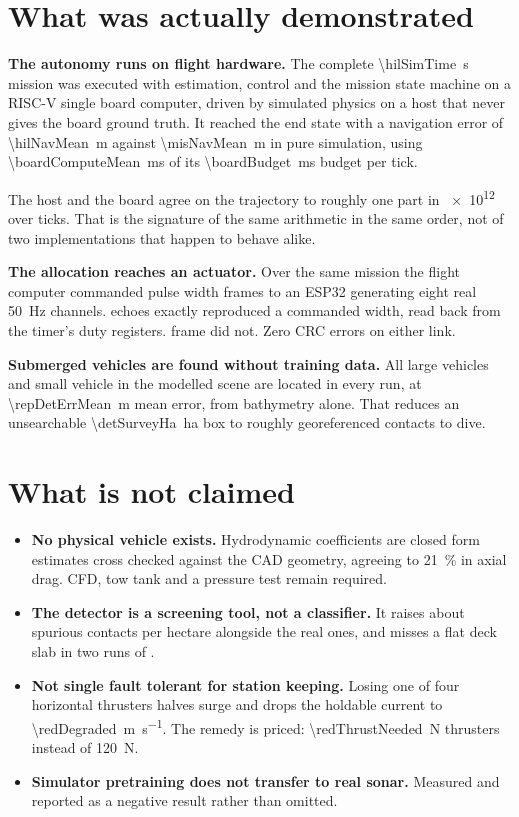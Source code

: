 \documentclass[10pt,a4paper]{article}
\begin{document}
\newpage

\section*{What was actually demonstrated}

\textbf{The autonomy runs on flight hardware.} The complete
\SI{\hilSimTime}{\second} mission was executed with estimation, control and
the mission state machine on a RISC-V single board computer, driven by
simulated physics on a host that never gives the board ground truth. It
reached the end state with a navigation error of \SI{\hilNavMean}{\metre}
against \SI{\misNavMean}{\metre} in pure simulation, using
\SI{\boardComputeMean}{\milli\second} of its \SI{\boardBudget}{\milli\second}
budget per tick.

The host and the board agree on the trajectory to roughly one part in
\num{e12} over \hilTicks{} ticks. That is the signature of the same arithmetic
in the same order, not of two implementations that happen to behave alike.

\textbf{The allocation reaches an actuator.} Over the same mission the flight
computer commanded \espSent{} pulse width frames to an ESP32 generating eight
real \SI{50}{\hertz} channels. \espMatched{} echoes exactly reproduced a
commanded width, read back from the timer's duty registers. \espMismatch{}
frame did not. Zero CRC errors on either link.

\textbf{Submerged vehicles are found without training data.} All
\detVehicleLargeHit{} large vehicles and \detVehicleSmallHit{} small
vehicle in the modelled scene are located in every run, at
\SI{\repDetErrMean}{\metre} mean error, from bathymetry alone. That
reduces an unsearchable \SI{\detSurveyHa}{\hectare} box to roughly
\detContacts{} georeferenced contacts to dive.

\section*{What is not claimed}

\begin{itemize}[leftmargin=*,itemsep=1pt,topsep=2pt]
\item \textbf{No physical vehicle exists.} Hydrodynamic coefficients are
closed form estimates cross checked against the CAD geometry, agreeing to
\SI{21}{\percent} in axial drag. CFD, tow tank and a pressure test remain
required.
\item \textbf{The detector is a screening tool, not a classifier.} It raises
about \detFalsePerHa{} spurious contacts per hectare alongside the real ones,
and misses a flat deck slab in two runs of \detRuns{}.
\item \textbf{Not single fault tolerant for station keeping.} Losing one of
four horizontal thrusters halves surge and drops the holdable current to
\SI{\redDegraded}{\metre\per\second}. The remedy is priced:
\SI{\redThrustNeeded}{\newton} thrusters instead of \SI{120}{\newton}.
\item \textbf{Simulator pretraining does not transfer to real sonar.} Measured
and reported as a negative result rather than omitted.
\end{itemize}
\end{document}
